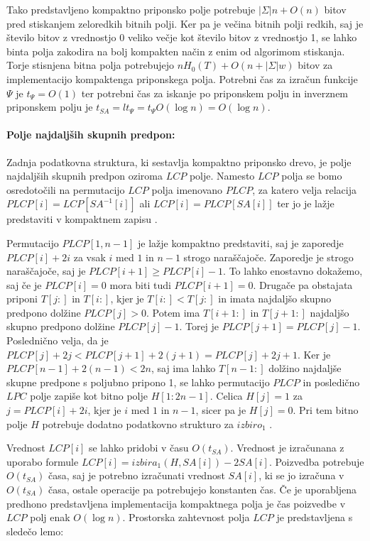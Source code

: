 Tako predstavljeno kompaktno priponsko polje potrebuje $|\Sigma|n + O(n)$ bitov pred stiskanjem zeloredkih bitnih polji. Ker pa je večina bitnih polji redkih, saj je število bitov z vrednostjo 0 veliko večje kot število bitov z vrednostjo 1, se lahko binta polja zakodira na bolj kompakten način z enim od algorimom stiskanja. Torje stisnjena bitna polja potrebujejo $nH_0(T)+O(n+|\Sigma|w)$ bitov za implementacijo kompaktenga priponskega polja. Potrebni čas za izračun funkcije $\Psi$ je $t_\Psi=O(1)$ ter potrebni čas za iskanje po priponskem polju in inverznem priponskem polju je $t_{SA}=lt_\Psi = t_\Psi O(\log{n}) = O(\log{n})$.


\paragraph{Polje najdaljših skupnih predpon:}
Zadnja podatkovna struktura, ki sestavlja kompaktno priponsko drevo, je polje najdaljših skupnih predpon oziroma $LCP$ polje. Namesto $LCP$ polja se bomo osredotočili na permutacijo $LCP$ polja imenovano $PLCP$, za katero velja relacija $PLCP[i]=LCP[SA^{-1}[i]]$ ali $LCP[i]=PLCP[SA[i]]$ ter jo je lažje predstaviti v kompaktnem zapisu \cite{Navarro2016, Sadakane2007}.


Permutacijo $PLCP[1,n-1]$ je lažje kompaktno predstaviti, saj je zaporedje $PLCP[i]+2i$ za vsak $i$ med $1$ in $n-1$ strogo naraščajoče. Zaporedje je strogo naraščajoče, saj je $PLCP[i+1]\ge PLCP[i]-1$. To lahko enostavno dokažemo, saj če je $PLCP[i]=0$ mora biti tudi $PLCP[i+1]=0$. Drugače pa obstajata priponi $T[j:]$ in $T[i:]$, kjer je $T[i:]<T[j:]$ in imata najdaljšo skupno predpono dolžine $PLCP[j]>0$. Potem ima $T[i+1:]$ in $T[j+1:]$ najdaljšo skupno predpono dolžine $PLCP[j]-1$. Torej je $PLCP[j+1] = PLCP[j]-1$. Poslednično velja, da je $PLCP[j]+2j<PLCP[j+1]+2(j+1)= PLCP[j]+2j+1$. Ker je $PLCP[n-1]+2(n-1)< 2n$, saj ima lahko $T[n-1:]$ dolžino najdaljše skupne predpone s poljubno pripono 1, se lahko permutacijo $PLCP$ in posledično $LPC$ polje zapiše kot bitno polje $H[1:2n-1]$. Celica $H[j]=1$ za $j=PLCP[i]+2i$, kjer je $i$ med $1$ in $n-1$, sicer pa je $H[j]=0$. Pri tem bitno polje $H$ potrebuje dodatno podatkovno strukturo za $izbiro_1$ \cite{Navarro2016, Sadakane2007}.

Vrednost $LCP[i]$ se lahko pridobi v času $O(t_{SA})$. Vrednost je izračunana z uporabo formule $LCP[i]=izbira_1(H,SA[i])-2SA[i]$. Poizvedba potrebuje $O(t_{SA})$ časa, saj je potrebno izračunati vrednost $SA[i]$, ki se jo izračuna v $O(t_{SA})$ časa, ostale operacije pa potrebujejo konstanten čas. Če je uporabljena predhono predstavljena implementacija kompaktnega polja je čas poizvedbe v $LCP$ polj enak $O(\log{n})$. Prostorska zahtevnost polja $LCP$ je predstavljena s sledečo lemo:

